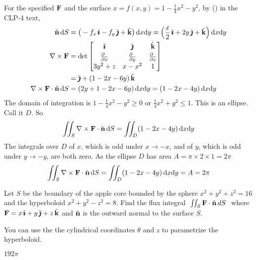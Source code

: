 \begin{solution} 
For the specified $\mathbf{F}$ and the surface 
$x=f(x,y)=1-\frac{1}{4}x^2-y^2$, by () in the CLP-4 text,
\begin{align*}
\hn\,\dee{S}&=\big(-f_x\,\hi-f_y\,\hj+\hk\big)\,\dee{x}\dee{y}
=\Big(\frac{x}{2}\,\hi+2y\,\hj+\hk\Big)\,\dee{x}\dee{y}\\
\nabla\times\vF&=\det\left[\begin{matrix}\hi&\hj&\hk\\[0.03in] 
     \frac{\partial\hfill}{\partial x}&
        \frac{\partial\hfill}{\partial y}&
        \frac{\partial\hfill}{\partial z}\\[0.03in]
3y^2+z&x-x^2&1\end{matrix}\right] \\
&=\hj+(1-2x-6y)\,\hk\\
\nabla\times\vF\cdot\hn\,\dee{S}&= (2y+1-2x-6y)\,\dee{x}\dee{y}= (1-2x-4y)\,\dee{x}\dee{y}
\end{align*}
The domain of integration is $1-\frac{1}{4}x^2-y^2\ge 0$ or
$\frac{1}{4}x^2+y^2\le 1$. This is an ellipse. Call it $D$. 
So
$$
\iint_S\nabla\times\mathbf{F}\cdot\hat{\mathbf{n}}\,\mathrm{d}S
=\iint_D (1-2x-4y)\,\mathrm{d}x\mathrm{d}y
$$
The integrals over $D$ of $x$, which is odd under $x\rightarrow-x$, 
and of $y$, which is odd under $y\rightarrow -y$, are both zero.
As the ellipse $D$ has area $A=\pi\times 2\times 1=2\pi$ 
$$
\iint_S\nabla\times\mathbf{F}\cdot\hat{\mathbf{n}}\,\mathrm{d}S
=\iint_D (1-2x-4y)\,\mathrm{d}x\mathrm{d}y
=A
=2\pi
$$
\end{solution}

\begin{question} 
Let $S$ be the boundary of the apple core bounded by the sphere 
$x^2+y^2+z^2=16$ and the hyperboloid $x^2+y^2-z^2=8$.
Find the flux integral
$\ \iint_S\mathbf{F}\cdot\hat{\mathbf{n}} \,dS\ $ where
$\mathbf{F}=x\,\hat{\pmb{\imath}}+y\,\hat{\pmb{\jmath}}+z\,\hat{\mathbf{k}}$
and $\hat{\mathbf{n}}$ is
the outward normal to the surface $S$.
\end{question}

\begin{hint}
You can use the the cylindrical coordinates $\theta$ and $z$ to 
parametrize the hyperboloid. 
\end{hint}

\begin{answer} 
$192\pi$
\end{answer}

